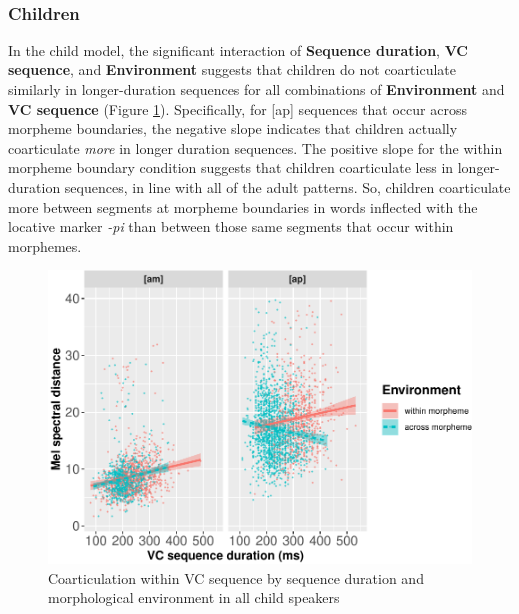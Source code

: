 \documentclass[a4paper,man,floatsintext,natbib,donotrepeattitle, apacite]{apa6}
\begin{document}
~

\subsubsection{Children}\label{children}

In the child model, the significant interaction of \textbf{Sequence duration}, \textbf{VC sequence}, and \textbf{Environment} suggests that children do not coarticulate similarly in longer-duration sequences for all combinations of \textbf{Environment} and \textbf{VC sequence} (Figure \ref{fig:child-int-plot}). Specifically, for {[}ap{]} sequences that occur across morpheme boundaries, the negative slope indicates that children actually coarticulate \emph{more} in longer duration sequences. The positive slope for the within morpheme boundary condition suggests that children coarticulate less in longer-duration sequences, in line with all of the adult patterns. So, children coarticulate more between segments at morpheme boundaries in words inflected with the locative marker \emph{-pi} than between those same segments that occur within morphemes.

\begin{figure}[H]
\centering
\includegraphics{3_ch3_results_files/figure-latex/child-int-plot-1.pdf}
\caption{\label{fig:child-int-plot}Coarticulation within VC sequence by sequence duration and morphological environment in all child speakers}
\end{figure}
\end{document}
